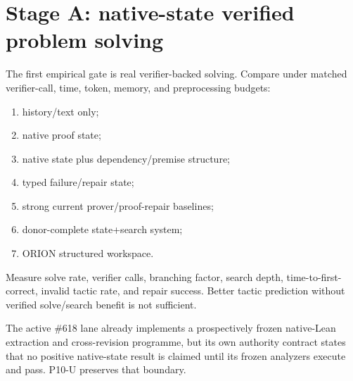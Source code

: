 \section{Stage A: native-state verified problem solving}
The first empirical gate is real verifier-backed solving. Compare under matched verifier-call, time, token, memory, and preprocessing budgets:
\begin{enumerate}
    \item history/text only;
    \item native proof state;
    \item native state plus dependency/premise structure;
    \item typed failure/repair state;
    \item strong current prover/proof-repair baselines;
    \item donor-complete state+search system;
    \item ORION structured workspace.
\end{enumerate}
Measure solve rate, verifier calls, branching factor, search depth, time-to-first-correct, invalid tactic rate, and repair success. Better tactic prediction without verified solve/search benefit is not sufficient.

The active \#618 lane already implements a prospectively frozen native-Lean extraction and cross-revision programme, but its own authority contract states that no positive native-state result is claimed until its frozen analyzers execute and pass. P10-U preserves that boundary.

